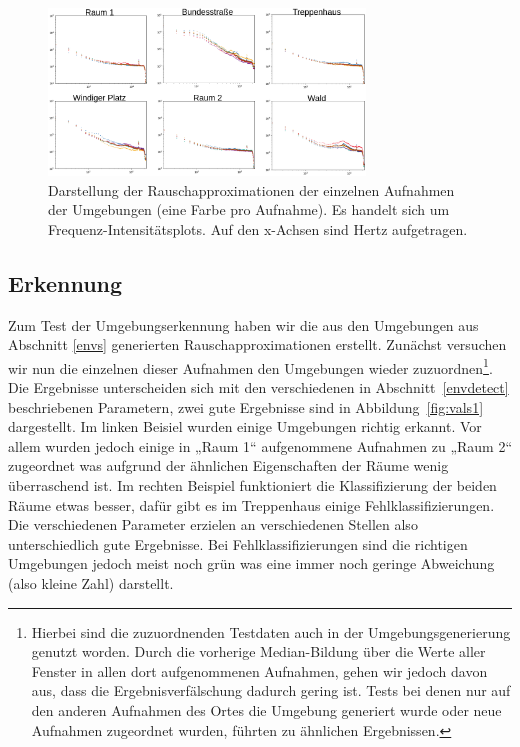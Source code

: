 \documentclass[
	fontsize=10.5pt,
	marginpar=false,
	ngerman,
	accentcolor=3d
	]{tudapub}
\begin{document}
\begin{figure}[h]
	\centering
	\includegraphics[width=0.75\textwidth]{media/envs2}
	\caption{Darstellung der Rauschapproximationen der einzelnen Aufnahmen der Umgebungen (eine Farbe pro Aufnahme). Es handelt sich um Frequenz-Intensitätsplots. Auf den x-Achsen sind Hertz aufgetragen.}
	\label{fig:envs2}
\end{figure}



\pagebreak
\subsection{Erkennung}
\label{erkennung}

Zum Test der Umgebungserkennung haben wir die aus den Umgebungen aus Abschnitt \ref{envs} generierten Rauschapproximationen erstellt. Zunächst versuchen wir nun die einzelnen dieser Aufnahmen den Umgebungen wieder zuzuordnen\footnote{Hierbei sind die zuzuordnenden Testdaten auch in der Umgebungsgenerierung genutzt worden. Durch die vorherige Median-Bildung über die Werte aller Fenster in allen dort aufgenommenen Aufnahmen, gehen wir jedoch davon aus, dass die Ergebnisverfälschung dadurch gering ist. Tests bei denen nur auf den anderen Aufnahmen des Ortes die Umgebung generiert wurde oder neue Aufnahmen zugeordnet wurden, führten zu ähnlichen Ergebnissen.}. Die Ergebnisse unterscheiden sich mit den verschiedenen in Abschnitt~\ref{envdetect} beschriebenen Parametern, zwei gute Ergebnisse sind in Abbildung~\ref{fig:vals1} dargestellt. Im linken Beisiel wurden einige Umgebungen richtig erkannt. Vor allem wurden jedoch einige in „Raum 1“ aufgenommene Aufnahmen zu „Raum 2“ zugeordnet was aufgrund der ähnlichen Eigenschaften der Räume wenig überraschend ist. Im rechten Beispiel funktioniert die Klassifizierung der beiden Räume etwas besser, dafür gibt es im Treppenhaus einige Fehlklassifizierungen. Die verschiedenen Parameter erzielen an verschiedenen Stellen also unterschiedlich gute Ergebnisse. Bei Fehlklassifizierungen sind die richtigen Umgebungen jedoch meist noch grün was eine immer noch geringe Abweichung (also kleine Zahl) darstellt.
\end{document}
